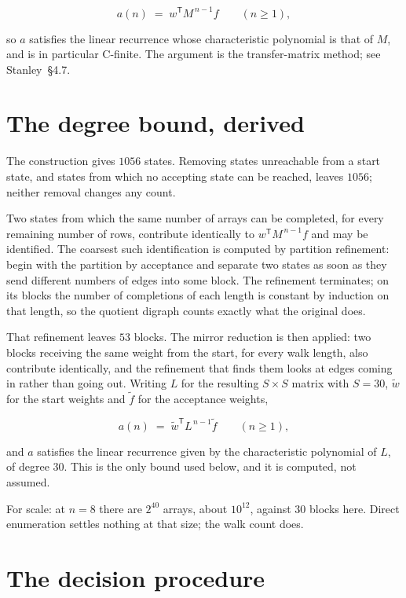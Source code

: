 \documentclass[11pt]{article}
\theoremstyle{definition}
\begin{document}
\[a(n) \;=\; w^{\mathsf T} M^{\,n-1} f \qquad (n \ge 1),\]

so $a$ satisfies the linear recurrence whose characteristic polynomial is that of $M$, and is in particular C-finite. The argument is the transfer-matrix method; see Stanley~\S4.7.

\section{The degree bound, derived}

The construction gives $1056$ states. Removing states unreachable from a start state, and states from which no accepting state can be reached, leaves $1056$; neither removal changes any count.

Two states from which the same number of arrays can be completed, for every remaining number of rows, contribute identically to $w^{\mathsf T}M^{\,n-1}f$ and may be identified. The coarsest such identification is computed by partition refinement: begin with the partition by acceptance and separate two states as soon as they send different numbers of edges into some block. The refinement terminates; on its blocks the number of completions of each length is constant by induction on that length, so the quotient digraph counts exactly what the original does.

That refinement leaves $53$ blocks. The mirror reduction is then applied: two blocks receiving the same weight from the start, for every walk length, also contribute identically, and the refinement that finds them looks at edges coming in rather than going out. Writing $L$ for the resulting $S \times S$ matrix with $S = 30$, $\tilde w$ for the start weights and $\tilde f$ for the acceptance weights,

\[a(n) \;=\; \tilde w^{\mathsf T} L^{\,n-1} \tilde f \qquad (n \ge 1),\]

and $a$ satisfies the linear recurrence given by the characteristic polynomial of $L$, of degree $30$. This is the only bound used below, and it is computed, not assumed.

For scale: at $n = 8$ there are $2^{40}$ arrays, about $10^{12}$, against $30$ blocks here. Direct enumeration settles nothing at that size; the walk count does.

\section{The decision procedure}
\end{document}

